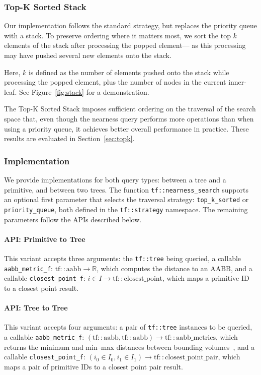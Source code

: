 \subsubsection{Top-K Sorted Stack}\label{sec:top-k}

Our implementation follows the standard strategy,
but replaces the priority queue with a stack. To preserve
ordering where it matters most, we sort the top $k$ elements
of the stack after processing the popped element—
as this processing may have pushed several new elements
onto the stack.

Here, $k$ is defined as the number of elements pushed onto the
stack while processing the popped element, plus the number
of nodes in the current inner-leaf. See Figure~\ref{fig:stack}
for a demonstration.


The Top-K Sorted Stack imposes sufficient ordering on the
traversal of the search space that, even though the nearness
query performs more operations than when using a
priority queue, it achieves better overall performance in
practice. These results are evaluated in
Section~\ref{sec:topk}.

\subsubsection{Implementation}

We provide implementations for both query types:
between a tree and a primitive, and between two trees.
The function \texttt{tf::nearness\_search} supports an
optional first parameter that selects the traversal
strategy: \texttt{top\_k\_sorted} or \texttt{priority\_queue},
both defined in the \texttt{tf::strategy} namespace.
The remaining parameters follow the APIs described below.

\paragraph*{API: Primitive to Tree}
This variant accepts three arguments:
the \texttt{tf::tree} being queried,
a callable \texttt{aabb\_metric\_f}:
$\mathrm{tf::aabb} \to \mathbb{R}$,
which computes the distance to an AABB,
and a callable \texttt{closest\_point\_f}:
$i \in I \to \mathrm{tf::closest\_point}$,
which maps a primitive ID to a closest point result.

\paragraph*{API: Tree to Tree}
This variant accepts four arguments:
a pair of \texttt{tf::tree} instances to be queried,
a callable \texttt{aabb\_metric\_f}:
$(\mathrm{tf::aabb}, \mathrm{tf::aabb}) \to \mathrm{tf::aabb\_metrics}$,
which returns the minimum and min–max distances between
bounding volumes~\cite{eknn},
and a callable \texttt{closest\_point\_f}:
$(i_0 \in I_0, i_1 \in I_1) \to \mathrm{tf::closest\_point\_pair}$,
which maps a pair of primitive IDs to a closest point pair result.

